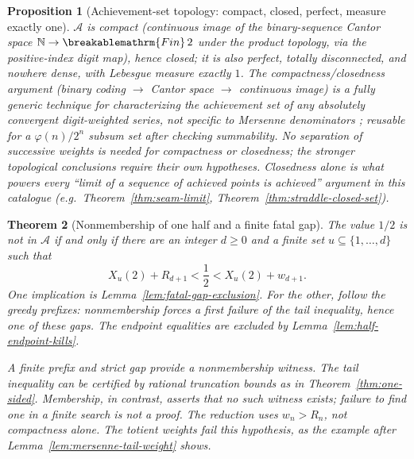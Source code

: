 \documentclass[11pt]{article}
\theoremstyle{plain}
\newtheorem{thm}{Theorem}[section]
\newtheorem{prop}[thm]{Proposition}
\theoremstyle{definition}
\theoremstyle{remark}
\renewcommand{\mathrm}[1]{\ifmmode\breakablemathrm{#1}\else\textrm{#1}\fi}%
\begin{document}
\begin{prop}[Achievement-set topology: compact, closed, perfect, measure exactly one]
\label{prop:achievement-set-topology}
$\ensuremath{\mathcal A}$ is compact (continuous image of the binary-sequence
Cantor space $\mathbb N\to\mathrm{Fin}\,2$ under the product topology, via
the positive-index digit map), hence closed; it is also perfect, totally
disconnected, and nowhere dense, with Lebesgue measure exactly $1$. The
compactness/closedness argument (binary coding $\to$ Cantor space $\to$ continuous image)
is a fully generic technique for characterizing the achievement set of \emph{any}
absolutely convergent digit-weighted series, not specific to Mersenne denominators ;
reusable for a $\varphi(n)/2^n$ subsum set after checking summability.
No separation of successive weights is needed for compactness or
closedness; the stronger topological conclusions require their own
hypotheses. Closedness alone is what powers every ``limit of a sequence of
achieved points is achieved'' argument in this catalogue (e.g.\
Theorem~\ref{thm:seam-limit}, Theorem~\ref{thm:straddle-closed-set}).
\end{prop}

\begin{thm}[Nonmembership of one half and a finite fatal gap]
\label{thm:master-dichotomy}
The value $1/2$ is not in $\mathcal A$ if and only if there are
an integer $d\ge0$ and a finite set $u\subseteq\{1,\ldots,d\}$
such that
\[
 X_u(2)+R_{d+1}<\frac12<X_u(2)+w_{d+1}.
\]
One implication is Lemma~\ref{lem:fatal-gap-exclusion}.  For the
other, follow the greedy prefixes: nonmembership forces a first
failure of the tail inequality, hence one of these gaps.
The endpoint equalities are excluded by
Lemma~\ref{lem:half-endpoint-kills}.

A finite prefix and strict gap provide a nonmembership witness.
The tail inequality can be certified by rational truncation bounds
as in Theorem~\ref{thm:one-sided}.  Membership, in contrast, asserts
that no such witness exists; failure to find one in a finite search
is not a proof.  The reduction uses $w_n>R_n$, not compactness
alone.  The totient weights fail this hypothesis, as the example
after Lemma~\ref{lem:mersenne-tail-weight} shows.
\end{thm}
\end{document}
